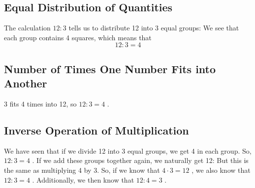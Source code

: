 	
	\newpage
	\subsection*{Equal Distribution of Quantities}
	The calculation
	$ {12:3} $
	tells us to distribute 12 into 3 equal groups:
	We see that each group contains 4 squares, which means that
	\[ 12:3=4 \]
	
	\subsection*{Number of Times One Number Fits into Another}
	3 fits 4 times into 12, so
	$ 12:3=4 $
	.
	
	\subsection*{Inverse Operation of Multiplication}
	We have seen that if we divide 12 into 3 equal groups, we get 4 in each group. So,
	$ 12:3=4 $
	. If we add these groups together again, we naturally get 12:
	But this is the same as multiplying 4 by 3. So, if we know that
	$ {4\cdot 3=12} $
	, we also know that
	$ {12:3=4} $
	. Additionally, we then know that
	$ {12:4=3} $
	.
	
	
